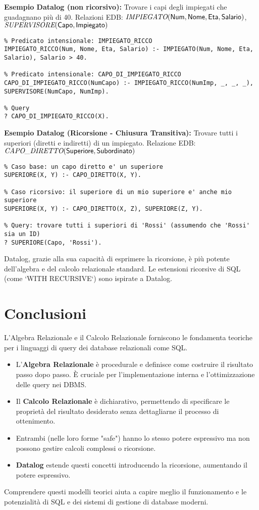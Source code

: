 	\textbf{Esempio Datalog (non ricorsivo):} Trovare i capi degli impiegati che guadagnano più di 40.
	Relazioni EDB: $\textit{IMPIEGATO}(\textsf{Num}, \textsf{Nome}, \textsf{Eta}, \textsf{Salario})$, $\textit{SUPERVISORE}(\textsf{Capo}, \textsf{Impiegato})$
	\begin{verbatim}
% Predicato intensionale: IMPIEGATO_RICCO
IMPIEGATO_RICCO(Num, Nome, Eta, Salario) :- IMPIEGATO(Num, Nome, Eta, Salario), Salario > 40.

% Predicato intensionale: CAPO_DI_IMPIEGATO_RICCO
CAPO_DI_IMPIEGATO_RICCO(NumCapo) :- IMPIEGATO_RICCO(NumImp, _, _, _),
SUPERVISORE(NumCapo, NumImp).

% Query
? CAPO_DI_IMPIEGATO_RICCO(X).
	\end{verbatim}
	
	\textbf{Esempio Datalog (Ricorsione - Chiusura Transitiva):} Trovare tutti i superiori (diretti e indiretti) di un impiegato.
	Relazione EDB: $\textit{CAPO\_DIRETTO}(\textsf{Superiore}, \textsf{Subordinato})$
	\begin{verbatim}
% Caso base: un capo diretto e' un superiore
SUPERIORE(X, Y) :- CAPO_DIRETTO(X, Y).

% Caso ricorsivo: il superiore di un mio superiore e' anche mio superiore
SUPERIORE(X, Y) :- CAPO_DIRETTO(X, Z), SUPERIORE(Z, Y).

% Query: trovare tutti i superiori di 'Rossi' (assumendo che 'Rossi' sia un ID)
? SUPERIORE(Capo, 'Rossi').
	\end{verbatim}
	Datalog, grazie alla sua capacità di esprimere la ricorsione, è più potente dell'algebra e del calcolo relazionale standard. Le estensioni ricorsive di SQL (come `WITH RECURSIVE`) sono ispirate a Datalog.
	
	\section{Conclusioni}
	L'Algebra Relazionale e il Calcolo Relazionale forniscono le fondamenta teoriche per i linguaggi di query dei database relazionali come SQL.
	\begin{itemize}
		\item L'\textbf{Algebra Relazionale} è procedurale e definisce come costruire il risultato passo dopo passo. È cruciale per l'implementazione interna e l'ottimizzazione delle query nei DBMS.
		\item Il \textbf{Calcolo Relazionale} è dichiarativo, permettendo di specificare le proprietà del risultato desiderato senza dettagliarne il processo di ottenimento.
		\item Entrambi (nelle loro forme "safe") hanno lo stesso potere espressivo ma non possono gestire calcoli complessi o ricorsione.
		\item \textbf{Datalog} estende questi concetti introducendo la ricorsione, aumentando il potere espressivo.
	\end{itemize}
	Comprendere questi modelli teorici aiuta a capire meglio il funzionamento e le potenzialità di SQL e dei sistemi di gestione di database moderni.
	

